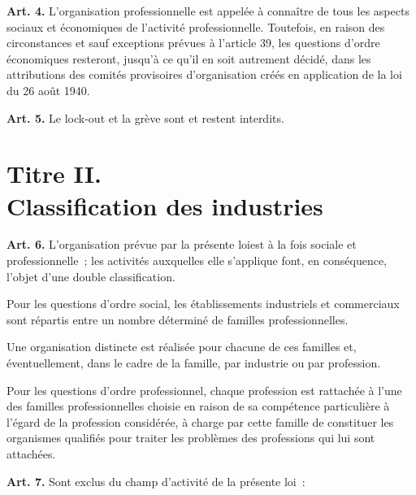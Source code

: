 \documentclass[french,twoside]{book} %
\newcommand{\labelchar}[1]{\textbf{\color{rubric} #1}}
\def\mednobreak{\ifdim\lastskip<\medskipamount
  \removelastskip\nopagebreak\medskip\fi}
\newcommand{\labelblock}[1]{\medbreak{\noindent\color{rubric}\bfseries #1}\par\mednobreak}
\begin{document}
\bigbreak
\noindent \labelchar{Art. 4.} L’organisation professionnelle est appelée à connaître de tous les aspects sociaux et économiques de l’activité professionnelle. Toutefois, en raison des circonstances et sauf exceptions prévues à l’article 39, les questions d’ordre économiques resteront, jusqu’à ce qu’il en soit autrement décidé, dans les attributions des comités provisoires d’organisation créés en application de la loi du 26 août 1940.\par
\bigbreak
\noindent \labelchar{Art. 5.} Le lock-out et la grève sont et restent interdits.
\renewcommand{\leftmark}{Titre II. \\
Classification des industries}
\section[Titre II. Classification des industries]{Titre II. \\
Classification des industries}

\labelblock{Commerces et professions}

\noindent \labelchar{Art. 6.} L’organisation prévue par la présente loiest à la fois sociale et professionnelle ; les activités auxquelles elle s’applique font, en conséquence, l’objet d’une double classification.\par
Pour les questions d’ordre social, les établissements industriels et commerciaux sont répartis entre un nombre déterminé de familles professionnelles.\par
Une organisation distincte est réalisée pour chacune de ces familles et, éventuellement, dans le cadre de la famille, par industrie ou par profession.\par
Pour les questions d’ordre professionnel, chaque profession est rattachée à l’une des familles professionnelles choisie en raison de sa compétence particulière à l’égard de la profession considérée, à charge par cette famille de constituer les organismes qualifiés pour traiter les problèmes des professions qui lui sont attachées.\par
\bigbreak
\noindent \labelchar{Art. 7.} Sont exclus du champ d’activité de la présente loi :\par
\end{document}
